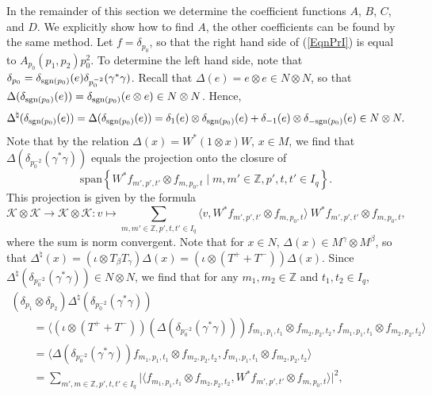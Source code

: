 \documentclass[pdftex]{sigma}
\numberwithin{equation}{section}
\theoremstyle{definition}
\newcommand{\sgn}{\text{\rm sgn}}
\begin{document}
In the remainder of this section we determine the coef\/f\/icient functions $A$, $B$, $C$, and $D$. We explicitly show how to f\/ind $A$, the other coef\/f\/icients can be found by the same method. Let $f = \delta_{p_0}$, so that the right hand side of (\ref{EqnPrI}) is equal to $A_{p_0}(p_1, p_2) p_0^2$. To determine the left hand side, note that $\delta_{p_0} = \delta_{\sgn(p_0)}(e) \delta_{p_0^{-2}} (\gamma^\ast \gamma)$. Recall that $\Delta(e) = e \otimes e \in N \otimes N$, so that $ \Delta( \delta_{\sgn(p_0)}(e) ) = \delta_{\sgn(p_0)}(e \otimes e) \in N \otimes N$. Hence,
\[
\Delta^\natural (\delta_{\sgn(p_0)}(e)) = \Delta( \delta_{\sgn(p_0)}(e) ) =\delta_1(e) \otimes \delta_{\sgn(p_0) }(e) + \delta_{-1}(e) \otimes \delta_{-\sgn(p_0) }(e) \in N \otimes N.
\]
Note that by the relation $\Delta(x) = W^\ast (1 \otimes x) W$, $x \in M$, we f\/ind that $\Delta( \delta_{p_0^{-2}} (\gamma^\ast \gamma) )$ equals the projection onto the closure of
\[
\textrm{span} \left\{ W^\ast f_{m', p' , t'} \otimes f_{m, p_0, t} \mid m, m' \in \mathbb{Z}, p', t, t' \in I_q \right\}.
\]
This projection is given by the formula
\[
\mathcal{K} \otimes \mathcal{K}  \rightarrow \mathcal{K} \otimes \mathcal{K}:  v \mapsto \sum_{m, m' \in \mathbb{Z}, p', t, t'\in I_q} \langle v , W^\ast f_{m', p', t'} \otimes f_{m, p_0, t} \rangle \: W^\ast f_{m', p', t'} \otimes f_{m, p_0, t},
\]
where the sum is norm convergent. Note that for $x \in N$, $\Delta(x) \in M^\gamma \otimes M^\beta$, so that $\Delta^\natural(x) = (\iota \otimes T_\beta T_\gamma) \Delta(x) = (\iota \otimes (T^+ +T^-)) \Delta(x)$. Since $\Delta^\natural ( \delta_{p_0^{-2}} (\gamma^\ast \gamma) ) \in N \otimes N$, we f\/ind that for any $m_1, m_2 \in \mathbb{Z}$ and $t_1, t_2 \in I_q$,
\begin{gather}
 (\delta_{p_1} \otimes \delta_{p_2}) \Delta^\natural ( \delta_{p_0^{-2}} (\gamma^\ast \gamma) )  \nonumber\\
 \qquad{} =
 \langle (\iota \otimes (T^+ + T^-))( \Delta  ( \delta_{p_0^{-2}} (\gamma^\ast \gamma) )) f_{m_1, p_1, t_1} \otimes f_{m_2, p_2, t_2}, f_{m_1, p_1, t_1} \otimes f_{m_2, p_2, t_2} \rangle \nonumber\\
 \qquad{} =
 \langle   \Delta  ( \delta_{p_0^{-2}} (\gamma^\ast \gamma) ) f_{m_1, p_1, t_1} \otimes f_{m_2, p_2, t_2}, f_{m_1, p_1, t_1} \otimes f_{m_2, p_2, t_2} \rangle
 \nonumber\\
 \qquad{} =
\sum_{m', m \in \mathbb{Z}, p', t , t' \in I_q} \vert \langle f_{m_1, p_1, t_1} \otimes f_{m_2, p_2, t_2} , W^\ast f_{m', p', t'} \otimes f_{m, p_0, t} \rangle \vert^2 ,\label{EqnGammaComp}
\end{gather}
\end{document}
